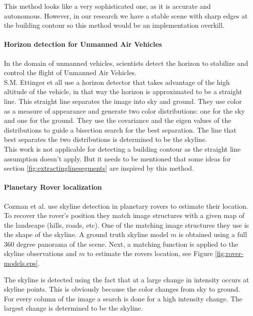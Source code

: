 This method looks like a very sophisticated one, as it is accurate and autonomous.
However, in our research we have a stable scene with sharp edges at the building
contour so this method would be an implementation overkill. \\


\paragraph{Horizon detection for Unmanned Air Vehicles}
In the domain \cite{Guidedflight} of unmanned vehicles, scientists detect the horizon to stabilize and control the
flight of Unmanned Air Vehicles.\\  
S.M. Ettinger et all \cite{Guidedflight} use a horizon detector that takes
advantage of the high altitude of the vehicle, in that way the horizon is
approximated to be a straight line. 
This straight line separates the image into sky and ground. They use color as
a measure of appearance and generate two color distributions: one for the sky
and one for the ground. They use the covariance and the eigen values of the
distributions to guide a bisection search for the best separation. The line that
best separates the two distributions is determined to be the skyline.\\

This work is not applicable for detecting a building contour as the straight
line assumption doesn't apply. But it needs to be mentioned that some ideas for
section \ref{fig:extractinglinesegments} are inspired by this method.

\paragraph{Planetary Rover localization}
Cozman et al. \cite{Rover} use skyline detection in planetary rovers to estimate 
their location. 
To recover the rover's position they match image structures with a given map
of the landscape (hills, roads, etc). One of the matching image structures they
use is the shape of the skyline.
A ground truth skyline model $m$ is obtained using a full 360 degree panorama of the scene.
Next, a matching function is applied to the skyline observations and $m$ to estimate
the rovers location, see Figure \ref{fig:rover-models.eps}. 


The skyline is detected using the fact that at a large change in intensity
occurs at skyline points. This is obviously because the color changes from sky to ground.
For every column of the image a search is done for a high intensity change. The 
largest change is determined to be the skyline.\\

